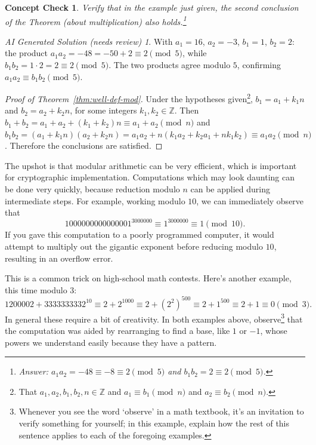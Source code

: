 \documentclass{article}
\theoremstyle{plain}
\newtheorem{checkin}[theorem]{Concept Check}
\theoremstyle{definition}
\theoremstyle{remark}
\newtheorem*{aisolution}{AI Generated Solution (needs review)}
\numberwithin{theorem}{section}
\newcommand{\ZZ}{\mathbb{Z}}
\begin{document}
\begin{checkin}
    Verify that in the example just given, the second conclusion of the Theorem (about multiplication) also holds.\footnote{Answer:  $a_1a_2 = -48 \equiv -8 \equiv 2 \pmod{5}$ and $b_1b_2 = 2 \equiv 2 \pmod{5}$.}
\end{checkin}
\begin{aisolution}
With $a_1 = 16$, $a_2 = -3$, $b_1 = 1$, $b_2 = 2$: the product $a_1a_2 = -48 = -50 + 2 \equiv 2 \pmod 5$, while $b_1 b_2 = 1\cdot 2 = 2 \equiv 2 \pmod 5$.  The two products agree modulo $5$, confirming $a_1a_2 \equiv b_1b_2 \pmod 5$.
\end{aisolution}

\begin{proof}[Proof of Theorem~\ref{thm:well-def-mod}]
	Under the hypotheses given\footnote{That $a_1, a_2, b_1, b_2, n \in \ZZ$ and $a_1 \equiv b_1 \pmod n$ and $a_2 \equiv b_2 \pmod n$.}, $b_1 = a_1 + k_1n$ and $b_2 = a_2 + k_2n$, for some integers $k_1, k_2 \in \ZZ$.  Then $b_1 + b_2 = a_1 + a_2 + (k_1+k_2)n \equiv a_1+a_2 \pmod{n}$ and $b_1b_2 = (a_1+k_1n)(a_2+k_2n) = a_1a_2 + n(k_1a_2+k_2a_1 + nk_1k_2) \equiv a_1a_2 \pmod{n}$.  Therefore the conclusions are satisfied.
\end{proof}

The upshot is that modular arithmetic can be very efficient, which is important for cryptographic implementation.  Computations which may look daunting can be done very quickly, because reduction modulo $n$ can be applied during intermediate steps.  For example, working modulo $10$, we can immediately observe that
\[
	1000000000000001^{3000000} \equiv 1^{3000000} \equiv 1 \pmod{10}.
\]
If you gave this computation to a poorly programmed computer, it would attempt to multiply out the gigantic exponent before reducing modulo $10$, resulting in an overflow error.

This is a common trick on high-school math contests.  Here's another example, this time modulo $3$:
\[
	1200002 + 3333333332^{10} \equiv 2 + 2^{1000} \equiv 2 + (2^2)^{500} \equiv 2 + 1^{500} \equiv 2 + 1 \equiv 0 \pmod{3}.
\]
In general these require a bit of creativity.  In both examples above, observe\footnote{Whenever you see the word `observe' in a math textbook, it's an invitation to verify something for yourself; in this example, explain how the rest of this sentence applies to each of the foregoing examples.} that the computation was aided by rearranging to find a base, like $1$ or $-1$, whose powers we understand easily because they have a pattern.
\end{document}
